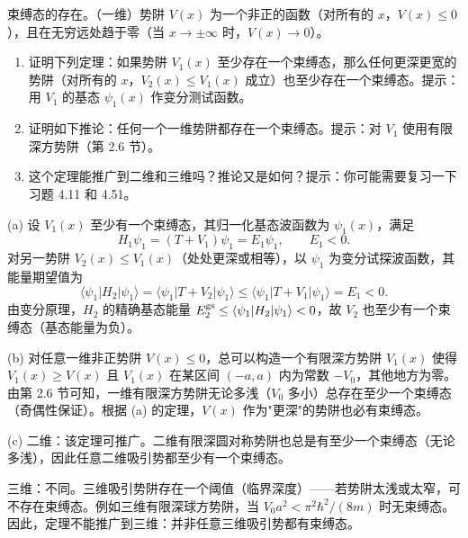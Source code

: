 \begin{question}
束缚态的存在。（一维）势阱 $V(x)$ 为一个非正的函数（对所有的 $x$，$V(x)\le0$），且在无穷远处趋于零（当 $x\to\pm\infty$ 时，$V(x)\to0$）。
\begin{enumerate}
\item 证明下列定理：如果势阱 $V_1(x)$ 至少存在一个束缚态，那么任何更深更宽的势阱（对所有的 $x$，$V_2(x)\le V_1(x)$ 成立）也至少存在一个束缚态。提示：用 $V_1$ 的基态 $\psi_1(x)$ 作变分测试函数。
\item 证明如下推论：任何一个一维势阱都存在一个束缚态。提示：对 $V_1$ 使用有限深方势阱（第 2.6 节）。
\item 这个定理能推广到二维和三维吗？推论又是如何？提示：你可能需要复习一下习题 4.11 和 4.51。
\end{enumerate}
\end{question}
\begin{solution}
(a) 设 $V_1(x)$ 至少有一个束缚态，其归一化基态波函数为 $\psi_1(x)$，满足
\[
H_1\psi_1=(T+V_1)\psi_1=E_1\psi_1,\qquad E_1<0.
\]
对另一势阱 $V_2(x)\le V_1(x)$（处处更深或相等），以 $\psi_1$ 为变分试探波函数，其能量期望值为
\[
\langle\psi_1|H_2|\psi_1\rangle=\langle\psi_1|T+V_2|\psi_1\rangle
\le\langle\psi_1|T+V_1|\psi_1\rangle=E_1<0.
\]
由变分原理，$H_2$ 的精确基态能量 $E_2^{\rm gs}\le\langle\psi_1|H_2|\psi_1\rangle<0$，故 $V_2$ 也至少有一个束缚态（基态能量为负）。

(b) 对任意一维非正势阱 $V(x)\le0$，总可以构造一个有限深方势阱 $V_1(x)$ 使得 $V_1(x)\ge V(x)$ 且 $V_1(x)$ 在某区间 $(-a,a)$ 内为常数 $-V_0$，其他地方为零。由第 2.6 节可知，一维有限深方势阱无论多浅（$V_0$ 多小）总存在至少一个束缚态（奇偶性保证）。根据 (a) 的定理，$V(x)$ 作为"更深"的势阱也必有束缚态。

(c) 二维：该定理可推广。二维有限深圆对称势阱也总是有至少一个束缚态（无论多浅），因此任意二维吸引势都至少有一个束缚态。

三维：不同。三维吸引势阱存在一个阈值（临界深度）——若势阱太浅或太窄，可不存在束缚态。例如三维有限深球方势阱，当 $V_0 a^2<\pi^2\hbar^2/(8m)$ 时无束缚态。因此，定理不能推广到三维：并非任意三维吸引势都有束缚态。
\end{solution}

